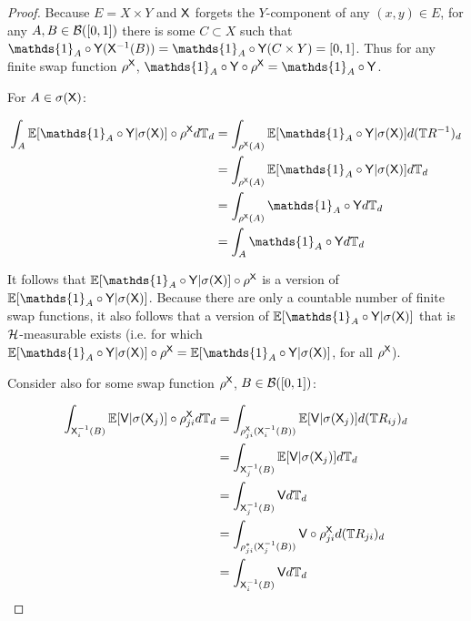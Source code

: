 \begin{proof}
Because $E=X\times Y$ and $\mathsf{X}$ forgets the $Y$-component of any $(x,y)\in E$, for any $A,B\in\mathcal{B}([0,1])$ there is some $C\subset X$ such that $\mathds{1}_{A}\circ\RV{Y}(\RV{X}^{-1}(B)) = \mathds{1}_{A}\circ\RV{Y} (C\times Y) = [0,1]$. Thus for any finite swap function $\rho^{\mathsf{X}}$, $\mathds{1}_{A}\circ\RV{Y}\circ \rho^{\RV{X}} = \mathds{1}_{A}\circ\RV{Y}$.

For $A\in \sigma(\mathsf{X})$:

\begin{align}
    \int_{A} \mathbb{E}[\mathds{1}_A\circ\RV{Y}|\sigma(\RV{X})] \circ\rho^{\RV{X}} d\kernel{T}_d &= \int_{\rho^{\RV{X}}(A)} \mathbb{E}[\mathds{1}_A\circ\RV{Y}|\sigma(\RV{X})] d(\kernel{T}R^{-1})_d\\
                                                                         &= \int_{\rho^{\RV{X}}(A)} \mathbb{E}[\mathds{1}_A\circ\RV{Y}|\sigma(\RV{X})] d\kernel{T}_d \\
                                                                         &= \int_{\rho^{\RV{X}}(A)} \mathds{1}_A\circ\RV{Y}d\kernel{T}_d\\
                                                                         &= \int_A \mathds{1}_A\circ\RV{Y} d\kernel{T}_d
\end{align}

It follows that $\mathbb{E}[\mathds{1}_A\circ\RV{Y}|\sigma(\RV{X})] \circ\rho^{\RV{X}}$ is a version of $\mathbb{E}[\mathds{1}_A\circ\RV{Y}|\sigma(\RV{X})]$. Because there are only a countable number of finite swap functions, it also follows that a version of $\mathbb{E}[\mathds{1}_A\circ\RV{Y}|\sigma(\RV{X})]$ that is $\mathcal{H}$-measurable exists (i.e. for which $\mathbb{E}[\mathds{1}_A\circ\RV{Y}|\sigma(\RV{X})]\circ\rho^{\RV{X}} = \mathbb{E}[\mathds{1}_A\circ\RV{Y}|\sigma(\RV{X})]$, for all $\rho^{\mathsf{X}}$).

Consider also for some swap function $\rho^{\mathsf{X}}$, $B\in \mathcal{B}([0,1])$:

\begin{align}
    \int_{\mathsf{X}_i^{-1}(B)} \mathbb{E}[\mathsf{V}|\sigma(\mathsf{X}_j)] \circ \rho^{\mathsf{X}}_{ji} d\mathbb{T}_d &= \int_{\rho^{\mathsf{X}}_{ji}(\mathsf{X}_i^{-1}(B))} \mathbb{E}[\mathsf{V}|\sigma(\mathsf{X}_j)] d(\mathbb{T}R_{ij})_d\\
                                                                               &= \int_{\mathsf{X}^{-1}_{j}(B)} \mathbb{E}[\mathsf{V}|\sigma(\mathsf{X}_j)] d\mathbb{T}_d\\
                                                                               &= \int_{\mathsf{X}_j^{-1}(B)} \mathsf{V} d\mathbb{T}_d\\
                                                                               &= \int_{\rho_{ji}^*(\mathsf{X}_j^{-1}(B))}\mathsf{V}\circ \rho^{\mathsf{X}}_{ji} d(\mathbb{T}R_{ji})_d\\
                                                                               &= \int_{\mathsf{X}_i^{-1}(B)} \mathsf{V}d\mathbb{T}_d
\end{align}


\end{proof}
